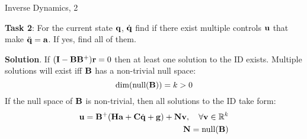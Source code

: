 \documentclass{beamer}
\begin{document}
\begin{frame}{Inverse Dynamics, 2}
	\begin{flushleft}
		
		\textbf{Task 2}: 
		For the current state $\mathbf{q}$, $\dot{\mathbf{q}}$ find if there exist multiple controls $\mathbf{u}$ that make $\ddot{\mathbf{q}} = \mathbf{a}$. If yes, find all of them.
		
		\bigskip
		
		\textbf{Solution}. If $(\mathbf{I} - \mathbf{B}\mathbf{B}^+)\mathbf{r} = 0$ then at least one solution to the ID exists. Multiple solutions will exist iff $\mathbf{B}$ has a non-trivial null space:
		\begin{equation}
			\text{dim}(\text{null}(\mathbf{B})) = k > 0
		\end{equation}		
		If the null space of $\mathbf{B}$ is non-trivial, then all solutions to the ID take form:
		\begin{align}
			\mathbf{u} = \mathbf{B}^+ (\mathbf{H} \mathbf{a} + \mathbf{C}\dot{\mathbf{q}} + \mathbf{g} ) + 
			\mathbf{N}\mathbf{v}, \ \ \ \forall \mathbf{v} \in \mathbb{R}^k
			\\
			\mathbf{N} = \text{null}(\mathbf{B})
		\end{align}		
		
	\end{flushleft}
\end{frame}
\end{document}
